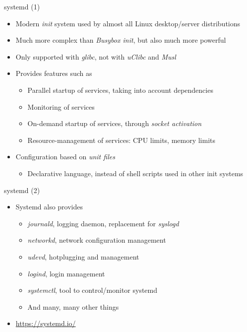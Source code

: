 \begin{frame}{systemd (1)}
  \begin{itemize}
  \item Modern {\em init} system used by almost all Linux
    desktop/server distributions
  \item Much more complex than {\em Busybox init}, but also much more
    powerful
  \item Only supported with {\em glibc}, not with {\em uClibc} and {\em Musl}
  \item Provides features such as
    \begin{itemize}
    \item Parallel startup of services, taking into account
      dependencies
    \item Monitoring of services
    \item On-demand startup of services, through {\em socket
        activation}
    \item Resource-management of services: CPU limits, memory limits
    \end{itemize}
  \item Configuration based on {\em unit files}
    \begin{itemize}
    \item Declarative language, instead of shell scripts used in other
      init systems
    \end{itemize}
  \end{itemize}
\end{frame}

\begin{frame}{systemd (2)}
  \begin{itemize}
  \item Systemd also provides
    \begin{itemize}
    \item {\em journald}, logging daemon, replacement for {\em syslogd}
    \item {\em networkd}, network configuration management
    \item {\em udevd}, hotplugging and  management
    \item {\em logind}, login management
    \item {\em systemctl}, tool to control/monitor systemd
    \item And many, many other things
    \end{itemize}
  \item \url{https://systemd.io/}
  \end{itemize}
\end{frame}

